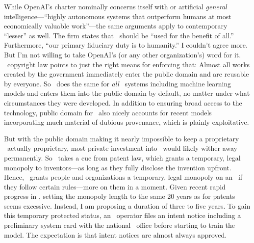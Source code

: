 While OpenAI's charter nominally concerns itself with \AGI or artificial
\emph{general} intelligence---``highly autonomous systems that outperform humans
at most economically valuable work''---the same arguments apply to contemporary
``lesser'' \AI as well. The firm states that \AI\ should be ``used for the
benefit of all.'' Furthermore, ``our primary fiduciary duty is to humanity.'' I
couldn't agree more. But I'm not willing to take OpenAI's (or any other
organization's) word for it. \US\ copyright law points to just the right means
for enforcing that: Almost all works created by the government immediately enter
the public domain and are reusable by everyone. So \AIP\ does the same for
\emph{all} \AI\ systems including machine learning models and enters them into
the public domain by default, no matter under what circumstances they were
developed. In addition to ensuring broad access to the technology, public domain
for \AI\ also nicely accounts for recent models incorporating much material of
dubious provenance, which is plainly exploitative.

But with the public domain making it nearly impossible to keep a proprietary
\AI\ actually proprietary, most private investment into \AI\ would likely wither
away permanently. So \AIP\ takes a cue from patent law, which grants a
temporary, legal monopoly to inventors---as long as they fully disclose the
invention upfront. Hence, \AIP\ grants people and organizations a temporary,
legal monopoly on an \AI\ if they follow certain rules---more on them in a
moment. Given recent rapid progress in \AI, setting the monopoly length to the
same 20 years as for patents seems excessive. Instead, I am proposing a duration
of three to five years. To gain this temporary protected status, an \AI\
operator files an intent notice including a preliminary system card with the
national \AIP\ office before starting to train the model. The expectation is
that intent notices are almost always approved.


